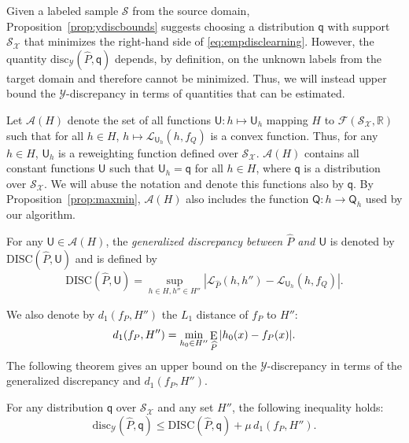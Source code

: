 \documentclass[twoside,11pt]{article}
\def\Rset{\mathbb{R}}
\DeclareMathOperator*{\E}{\rm E}
\newcommand{\h}{\widehat}
\newcommand{\cA}{{\mathcal A}}
\newcommand{\cF}{{\mathcal F}}
\newcommand{\cL}{{\mathcal L}}
\newcommand{\cS}{{\mathcal S}}
\newcommand{\cX}{{\mathcal X}}
\newcommand{\cY}{{\mathcal Y}}
\newcommand{\1}{\mat{1}}
\newcommand{\qq}{{\mathsf q}}
\newcommand{\QQ}{{\mathsf Q}}
\newcommand{\UU}{{\mathsf U}}
\newcommand{\dis}{\mathrm{disc}}
\newcommand{\DIS}{\mathrm{DISC}}
\newcommand{\done}{d_1}
\begin{document}
Given a labeled sample $\cS$ from the source domain,
Proposition~\ref{prop:ydiscbounds} suggests choosing a distribution
$\qq$ with support $\cS_\cX$ that minimizes the right-hand side of
\eqref{eq:empdisclearning}. However, the quantity
 $\dis_\cY(\h P, \qq)$ depends, by definition, on the unknown labels
from the target domain and therefore cannot be minimized. Thus, we
will instead upper bound the $\cY$-discrepancy in terms of quantities
that can be estimated.

Let $\cA(H)$ denote the set of all functions
$\UU\colon h \mapsto\UU_h$ mapping $H$ to $\cF(\cS_\cX, \Rset)$ such
that for all $h \in H$, $h \mapsto \cL_{\UU_h}(h, f_Q)$ is a convex
function. Thus, for any $h \in H$, $\UU_h$ is a reweighting function
defined over $\cS_\cX$.  $\cA(H)$ contains all constant functions
$\UU$ such that $\UU_h = \qq$ for all $h \in H$, where $\qq$ is a
distribution over $\cS_\cX$. We will abuse the notation and denote
this functions also by $\qq$. By Proposition~\ref{prop:maxmin},
$\cA(H)$ also includes the function $\QQ\colon h \to \QQ_h$ used by
our algorithm.

\begin{definition}
For any $\UU \in \cA(H)$, the \emph{generalized
discrepancy between $\h P$ and $\UU$} is denoted by $\DIS(\h P, \UU)$
and is defined by
\begin{equation}
\label{eq:DIS}
\DIS(\h P, \UU) = \sup_{h \in H, h'' \in H''} |\cL_{\h P}(h, h'')  - \cL_{\UU_h}(h, f_Q) |.
\end{equation}
\end{definition}
We also denote by $\done(f_P, H'')$ the $L_1$ distance of $f_P$ to $H''$:
\begin{equation}
\label{eq:delta}
\done(f_P, H'') = \min_{h_0 \in H''} \E_{\h P} |h_0(x) - f_P(x)|.
\end{equation}
The following theorem gives an upper bound on the $\cY$-discrepancy
in terms of the generalized discrepancy and $\done(f_P, H'')$.

\begin{proposition}
\label{prop:gendiscbound}
For any distribution $\qq$ over $\cS_\cX$ and any set $H''$, the
following inequality holds:
\begin{equation*}
 \dis_{\cY} (\h P, \qq) \leq \DIS(\h P, \qq) + \mu \, \done(f_P, H'').
\end{equation*}
\end{proposition}
\end{document}
